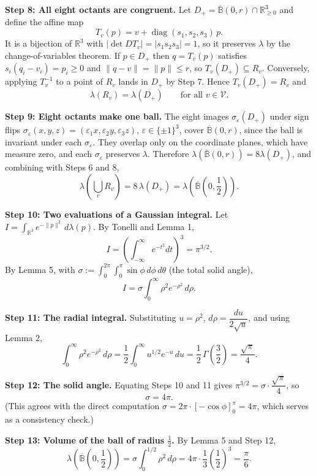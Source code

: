 \begin{enumerate}
 \textbf{Step 8: All eight octants are congruent.} Let $D_+=\overline{\mathbb{B}}(0,r)\cap\mathbb{R}^3_{\ge0}$ and define the affine map
 \[T_v(p)=v+\operatorname{diag}(s_1,s_2,s_3)\,p.\]It is a bijection of $\mathbb{R}^3$ with $|\det DT_v|=|s_1s_2s_3|=1$, so it preserves $\lambda$ by the change-of-variables theorem. If $p\in D_+$ then $q=T_v(p)$ satisfies $s_i(q_i-v_i)=p_i\ge0$ and $\|q-v\|=\|p\|\le r$, so $T_v(D_+)\subseteq R_v$. Conversely, applying $T_v^{-1}$ to a point of $R_v$ lands in $D_+$ by Step 7. Hence $T_v(D_+)=R_v$ and
 \[\lambda(R_v)=\lambda(D_+)\qquad\text{for all }v\in\mathcal{V}.\]

 \textbf{Step 9: Eight octants make one ball.} The eight images $\sigma_\varepsilon(D_+)$ under sign flips $\sigma_\varepsilon(x,y,z)=(\varepsilon_1x,\varepsilon_2y,\varepsilon_3z)$, $\varepsilon\in\{\pm1\}^3$, cover $\overline{\mathbb{B}}(0,r)$, since the ball is invariant under each $\sigma_\varepsilon$. They overlap only on the coordinate planes, which have measure zero, and each $\sigma_\varepsilon$ preserves $\lambda$. Therefore $\lambda\left(\overline{\mathbb{B}}(0,r)\right)=8\lambda(D_+)$, and combining with Steps 6 and 8,
 \[\lambda\left(\bigcup_vR_v\right)=8\,\lambda(D_+)=\lambda\left(\overline{\mathbb{B}}\left(0,\frac12\right)\right).\]

 \textbf{Step 10: Two evaluations of a Gaussian integral.} Let $I=\int_{\mathbb{R}^3}e^{-\|p\|^2}\,d\lambda(p)$. By Tonelli and Lemma 1,
 \[I=\left(\int_{-\infty}^{\infty}e^{-t^2}dt\right)^3=\pi^{3/2}.\]By Lemma 5, with $\sigma:=\int_0^{2\pi}\!\!\int_0^{\pi}\sin\phi\,d\phi\,d\theta$ (the total solid angle),
 \[I=\sigma\int_0^\infty\rho^2e^{-\rho^2}\,d\rho.\]

 \textbf{Step 11: The radial integral.} Substituting $u=\rho^2$, $d\rho=\dfrac{du}{2\sqrt u}$, and using Lemma 2,
 \[\int_0^\infty\rho^2e^{-\rho^2}\,d\rho=\frac12\int_0^\infty u^{1/2}e^{-u}\,du=\frac12\,\Gamma\left(\frac32\right)=\frac{\sqrt{\pi}}{4}.\]

 \textbf{Step 12: The solid angle.} Equating Steps 10 and 11 gives $\pi^{3/2}=\sigma\cdot\dfrac{\sqrt{\pi}}{4}$, so
 \[\sigma=4\pi.\](This agrees with the direct computation $\sigma=2\pi\cdot\left[-\cos\phi\right]_0^{\pi}=4\pi$, which serves as a consistency check.)

 \textbf{Step 13: Volume of the ball of radius $\frac12$.} By Lemma 5 and Step 12,
 \[\lambda\left(\overline{\mathbb{B}}\left(0,\frac12\right)\right)=\sigma\int_0^{1/2}\rho^2\,d\rho=4\pi\cdot\frac13\left(\frac12\right)^3=\frac{\pi}{6}.\]


\end{enumerate}
